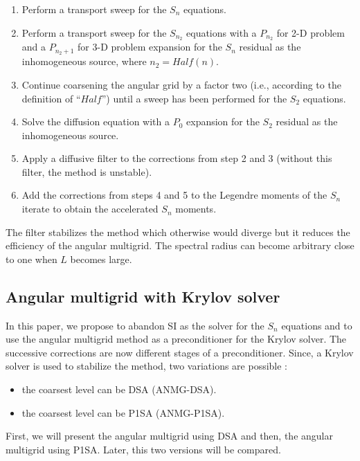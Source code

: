 \begin{enumerate}
\item Perform a transport sweep for the $S_n$ equations.
\item Perform a transport sweep for the $S_{n_2}$ equations with a $P_{n_2}$
for 2-D problem and a $P_{n_2+1}$ for 3-D problem expansion for the $S_n$
residual as the inhomogeneous source, where $n_2=Half(n)$.
\item Continue coarsening the angular grid by a factor two (i.e., according to the
definition of ``$Half$'') until a sweep has been performed for the $S_2$
equations.
\item Solve the diffusion equation with a $P_0$ expansion for the $S_2$
residual as the inhomogeneous source. 
\item Apply a diffusive filter to the corrections from step 2 and 3 (without
this filter, the method is unstable).
\item Add the corrections from steps 4 and 5 to the Legendre moments of the
$S_n$ iterate to obtain the accelerated $S_n$ moments.
\end{enumerate}
The filter stabilizes the method which otherwise would diverge but it reduces
the efficiency of the angular multigrid. The spectral radius can become
arbitrary close to one when $L$ becomes large.
\subsection{Angular multigrid with Krylov solver}
In this paper, we propose to abandon SI as the solver for the $S_n$ equations 
and to use the angular multigrid method as a preconditioner for the Krylov solver. 
The successive corrections
are now different stages of a preconditioner. Since, a Krylov solver is used to
stabilize the method, two variations are possible :
\begin{itemize}
\item the coarsest level can be DSA (ANMG-DSA).
\item the coarsest level can be P1SA (ANMG-P1SA).
\end{itemize}
First, we will present the angular multigrid using DSA and then, the angular
multigrid using P1SA. Later, this two versions will be compared.
